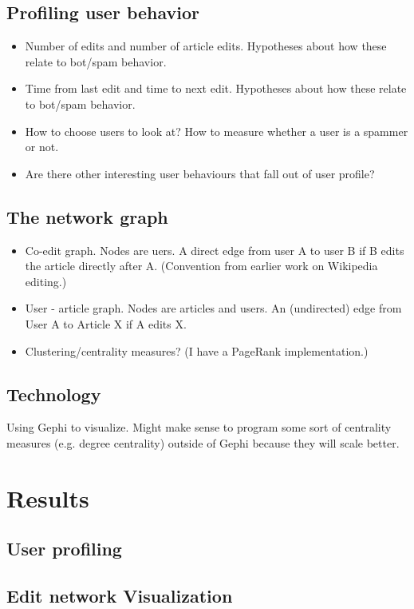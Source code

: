 \documentclass{article}
\begin{document}
\subsection{Profiling user behavior}
\begin{itemize}
\item Number of edits and number of article edits. Hypotheses about how these relate to bot/spam behavior.
\item Time from last edit and time to next edit. Hypotheses about how these relate to bot/spam behavior.
\item How to choose users to look at? How to measure whether a user is a spammer or not.
\item Are there other interesting user behaviours that fall out of user profile?
\end{itemize}

\subsection{The network graph}
\begin{itemize}
\item Co-edit graph. Nodes are uers. A direct edge from user A to user B if B edits the article directly after A. (Convention from earlier work on Wikipedia editing.)
\item User - article graph. Nodes are articles and users. An (undirected) edge from User A to Article X if A edits X.
\item Clustering/centrality measures? (I have a PageRank implementation.)
\end{itemize}

\subsection{Technology}
Using Gephi to visualize. Might make sense to program some sort of centrality measures (e.g. degree centrality) outside of Gephi because they will scale better.

\section{Results}
\subsection{User profiling}
\subsection{Edit network Visualization}
\end{document}
